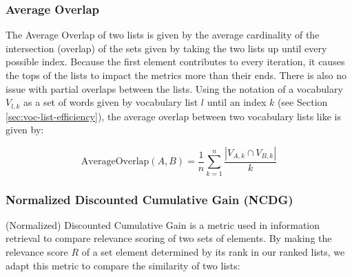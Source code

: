 \subsubsection{Average Overlap}
The Average Overlap \cite{webberSimilarityMeasureIndefinite2010} of two lists is given by the average cardinality of the intersection (overlap) of the sets given by taking the two lists up until every possible index.
Because the first element contributes to every iteration, it causes the tops of the lists to impact the metrics more than their ends.
There is also no issue with partial overlaps between the lists.
Using the notation of a vocabulary $V_{l, k}$ as a set of words given by vocabulary list $l$ until an index $k$ (see Section \ref{sec:voc-list-efficiency}), the average overlap between two vocabulary lists like is given by:

\begin{equation}
	\text{AverageOverlap}(A, B) = \frac{1}{n} \sum_{k=1}^{n} \frac{|V_{A, k}  \cap V_{B,k}|}{k}
\end{equation}


\subsubsection{Normalized Discounted Cumulative Gain (NCDG)}
(Normalized) Discounted Cumulative Gain \cite{jurafskySpeechLanguageProcessing2025} is a metric used in information retrieval to compare relevance scoring of two sets of elements.
By making the relevance score $R$ of a set element determined by its rank in our ranked lists, we adapt this metric to compare the similarity of two lists:


